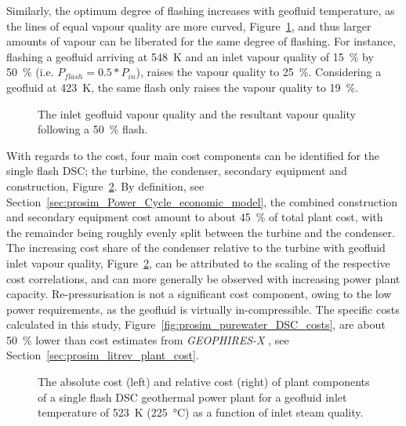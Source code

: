     Similarly, the optimum degree of flashing increases with geofluid temperature, as the lines of equal vapour quality are more curved, Figure~\ref{fig:prosim_purewater_DSC_flashing_degree}, and thus larger amounts of vapour can be liberated for the same degree of flashing. For instance, flashing a geofluid arriving at \qty{548}{\K} and an inlet vapour quality of \qty{15}{\percent} by \qty{50}{\percent} (i.e. \(P_{flash}=0.5*P_{in}\)), raises the vapour quality to \qty{25}{\percent}. Considering a geofluid at \qty{423}{\K}, the same flash only raises the vapour quality to \qty{19}{\percent}.

    \begin{figure}[H]
        \centering
        
        \caption{The inlet geofluid vapour quality and the resultant vapour quality following a \qty{50}{\percent} flash.}
        \label{fig:prosim_purewater_DSC_flashing_degree}
    \end{figure}

   With regards to the cost, four main cost components can be identified for the single flash \ac{DSC}; the turbine, the condenser, secondary equipment and construction, Figure~\ref{fig:prosim_purewater_DSC_CostBreakdown}. By definition, see Section~\ref{sec:prosim_Power_Cycle_economic_model}, the combined construction and secondary equipment cost amount to about \qty{45}{\percent} of total plant cost, with the remainder being roughly evenly split between the turbine and the condenser. The increasing cost share of the condenser relative to the turbine with geofluid inlet vapour quality, Figure~\ref{fig:prosim_purewater_DSC_CostBreakdown}, can be attributed to the scaling of the respective cost correlations, and can more generally be observed with increasing power plant capacity. Re-pressurisation is not a significant cost component, owing to the low power requirements, as the geofluid is virtually in-compressible. The specific costs calculated in this study, Figure~\ref{fig:prosim_purewater_DSC_costs}, are about \qty{50}{\percent} lower than cost estimates from \emph{GEOPHIRES-X} \cite{Beckers2023}, see Section~\ref{sec:prosim_litrev_plant_cost}.

    \begin{figure}[H]
        \centering
        
        \caption[The absolute cost (left) and relative cost (right) of plant components of a single flash \ac{DSC} geothermal power plant.]{The absolute cost (left) and relative cost (right) of plant components of a single flash \ac{DSC} geothermal power plant for a geofluid inlet temperature of \qty{523}{\K} (\qty{225}{\degreeCelsius}) as a function of inlet steam quality.}
        \label{fig:prosim_purewater_DSC_CostBreakdown}
    \end{figure}


